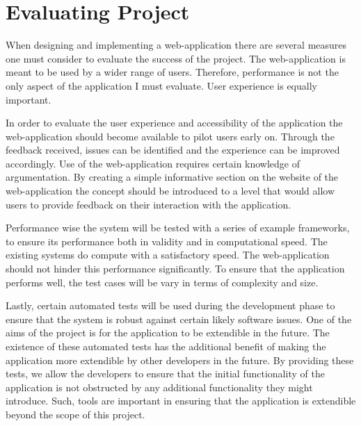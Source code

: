 \newpage
\chapter{Evaluating Project}

When designing and implementing a web-application there are several measures one must consider to evaluate the success of the project. The web-application is meant to be used by a wider range of users. Therefore, performance is not the only aspect of the application I must evaluate. User experience is equally important. 

In order to evaluate the user experience and accessibility of the application the web-application should become available to pilot users early on. Through the feedback received, issues can be identified and the experience can be improved accordingly. Use of the web-application requires certain knowledge of argumentation. By creating a simple informative section on the website of the web-application the concept should be introduced to a level that would allow users to provide feedback on their interaction with the application.

Performance wise the system will be tested with a series of example frameworks, to ensure its performance both in validity and in computational speed. The existing systems do compute with a satisfactory speed. The web-application should not hinder this performance significantly. To ensure that the application performs well, the test cases will be vary in terms of complexity and size.

Lastly, certain automated tests will be used during the development phase to ensure that the system is robust against certain likely software issues.  One of the aims of the project is for the application to be extendible in the future. The existence of these automated tests has the additional benefit of making the application more extendible by other developers in the future. By providing these tests, we allow the developers to ensure that the initial functionality of the application is not obstructed by any additional functionality they might introduce. Such, tools are important in ensuring that the application is extendible beyond the scope of this project.
